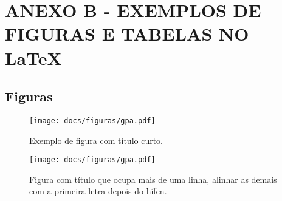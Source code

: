 \renewcommand{\thechapter}{}%
\chapter{ANEXO B - EXEMPLOS DE FIGURAS E TABELAS NO \LaTeX} %
\label{anexoB} %
\renewcommand{\thechapter}{B}%

\section{Figuras} %
\label{anexo2}

\begin{figure}[ht]
	\caption{Exemplo de figura com título curto.}
	\vspace{6mm}	%
	\begin{center}
    	\texttt{[image: docs/figuras/gpa.pdf]}  
	\end{center}
	\vspace{4mm}	%
	\label{figgpa1}
\end{figure}

\begin{figure}[!h]
	\caption{Figura com título que ocupa mais de uma linha, alinhar as demais com a primeira
letra depois do hífen.}
	\vspace{6mm}	%
	\begin{center}
    	\texttt{[image: docs/figuras/gpa.pdf]}  
	\end{center}
	\vspace{4mm}	%
	\label{figgpa2}
\end{figure}

